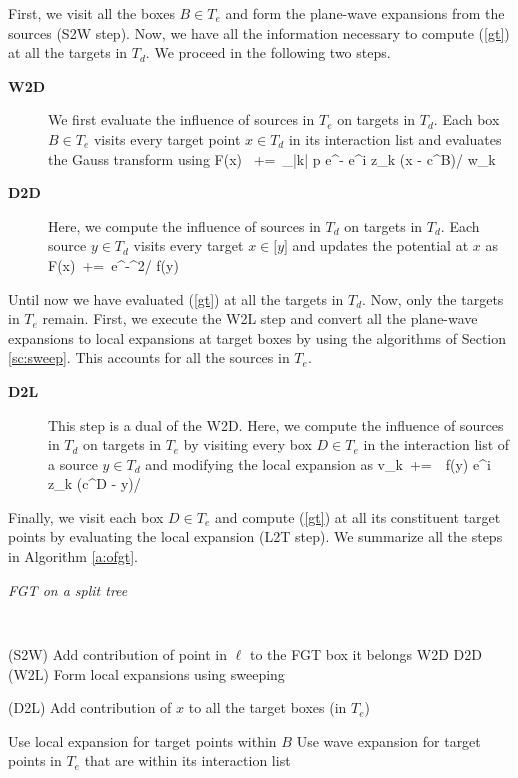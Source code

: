 First, we visit all the boxes $B \in T_e$ and form the plane-wave expansions from the sources (S2W step). Now, we have all the information necessary to compute (\ref{gt}) at all the targets in $T_d$. We proceed in the following two steps.
\begin{description}
\item[\textbf{W2D}] We first evaluate the influence of sources in $T_e$ on targets in $T_d$. Each box $B \in T_e$ visits every target point $x \in T_d$ in its interaction list and evaluates the Gauss transform using
%
\beq F(x) \, +=\, \sum_{|k| \leq p} e^{-} e^{i z_k \cdot (x - c^B)/\sqrt{\delta}} w_k \eeq
%
\item[\textbf{D2D}] Here, we compute the influence of sources in $T_d$ on targets in $T_d$. Each source $y \in T_d$ visits every target $x \in \mathcal[y]$ and updates the potential at $x$ as 
%  
\beq F(x) \,+=\, e^{-^2/\sqrt{\delta}} f(y) \eeq
%
\end{description}
%
Until now we have evaluated (\ref{gt}) at all the targets in $T_d$. Now, only the targets in $T_e$ remain. First, we execute the W2L step and convert all the plane-wave expansions to local expansions at target boxes by using the algorithms of Section \ref{sc:sweep}. This accounts for all the sources in $T_e$. 

\begin{description}
\item[\textbf{D2L}] This step is a dual of the W2D. Here, we compute the influence of sources in $T_d$ on targets in $T_e$ by visiting every box $D \in T_e$ in the interaction list of a source $y \in T_d$ and modifying the local expansion as 
%
\beq v_k  \,+=\, \, f(y) e^{i z_k \cdot (c^D - y)/\sqrt{\delta}} \eeq
\end{description}
Finally, we visit each box $D \in T_e$ and compute (\ref{gt}) at all its constituent target points by evaluating the local expansion (L2T step). We summarize all the steps in Algorithm \ref{a:ofgt}.  

\begin{algorithm}[!h]
\caption{\em FGT on a split tree}
\label{a:ofgt}
{\tt
\begin{algorithmic}
\STATE
      \STATE (S2W) Add contribution of point in $\ell$ to the FGT box it belongs
  \ENDFOR
  \STATE W2D
  \STATE D2D 
  \STATE (W2L) Form local expansions using sweeping
  \STATE 

          \STATE (D2L) Add contribution of $x$ to all the target boxes (in $T_e$) 
       \ENDFOR  
  \ENDFOR
  
  \STATE 
        \STATE Use local expansion for target points within $B$ 
        \STATE
        \STATE Use wave expansion for target points in $T_e$ that are within its interaction list
     \ENDFOR  
\STATE
\end{algorithmic}
}
\end{algorithm}

